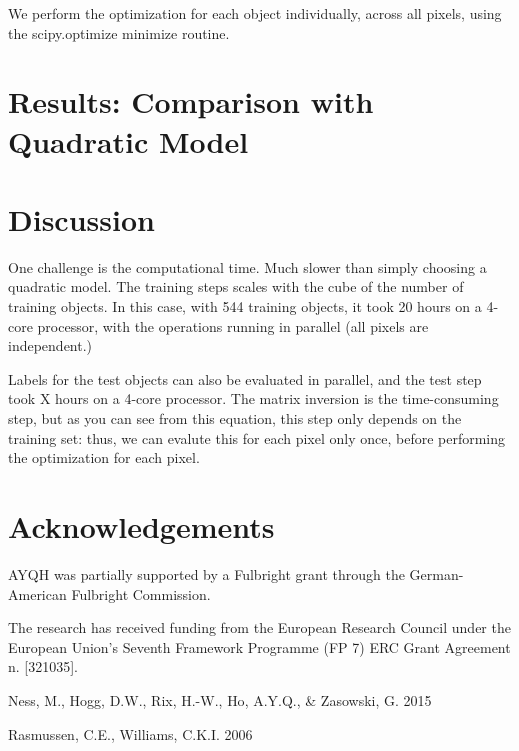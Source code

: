 \documentclass[12pt, preprint]{aastex}
\begin{document}
We perform the optimization for each object individually, across all pixels,
using the scipy.optimize minimize routine. 

\section{Results: Comparison with Quadratic Model}

\section{Discussion}

One challenge is the computational time. Much slower than simply choosing 
a quadratic model. The training steps scales 
with the cube of the number of training objects. In this case, with 544 
training objects, it took 20 
hours on a 4-core processor, with the operations running in parallel (all 
pixels are independent.) 

Labels for the test objects can also be 
evaluated in parallel, and the test step took X hours on a 4-core processor. 
The matrix inversion is the time-consuming step, but as you can see from this
equation, this step only depends on the training set: thus, we can evalute
this for each pixel only once, before performing the optimization for each 
pixel. 

\section{Acknowledgements}

AYQH was partially supported by a Fulbright grant through the German-American
Fulbright Commission.

The research has received funding from the European Research Council under the
European Union's Seventh Framework Programme (FP 7) ERC Grant Agreement n.
[321035].

\begin{thebibliography}{24}

    {Ness}, M., {Hogg}, D.W., {Rix}, H.-W., {Ho}, A.Y.Q., \& {Zasowski}, G. 2015

    {Rasmussen}, C.E., {Williams}, C.K.I. 2006

\end{thebibliography}
\end{document}
